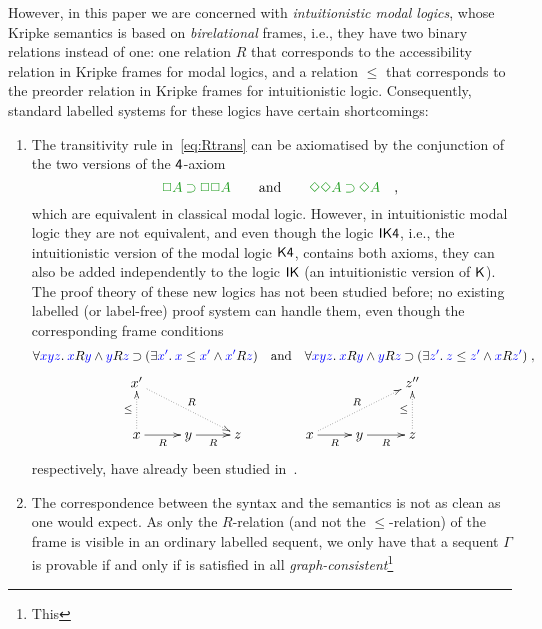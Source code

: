 However,
in this paper we are concerned with \emph{intuitionistic modal
	logics}, whose Kripke semantics is based on \emph{birelational}
frames, i.e., they have two binary relations instead of one: one
relation $R$ that corresponds to the accessibility relation in 
Kripke frames for modal logics, and a relation $\le$ that
corresponds to the preorder relation in Kripke frames for
intuitionistic logic. Consequently, standard labelled systems for
these logics have certain shortcomings:
\begin{enumerate}
	\item The transitivity rule in~\eqref{eq:Rtrans} can be axiomatised by the conjunction of the two
	versions of the $\mathsf{4}$-axiom
	\begin{equation}
	\label{eq:4ax}
	\fm{\BOX A\IMP \BOX\BOX A}
	\qquand
	\fm{\DIA\DIA A\IMP\DIA A}
	\quadcm
	\end{equation}
	which are equivalent in classical
	modal logic. However, in intuitionistic modal logic they are not
	equivalent, and even though the logic $\mathsf{IK4}$, i.e., the
	intuitionistic version of the modal logic $\mathsf{K4}$, contains both
	axioms, they can also be added independently to the logic $\mathsf{IK}$ (an
	intuitionistic version of $\mathsf{K}$). The proof theory of these
	new logics has not been studied before; no existing labelled (or
	label-free) proof system can handle them, even though the
	corresponding frame conditions
	\begin{equation}
	\label{eq:4frame}
	\forall{\color{blue}{xyz}}.\:{\color{blue}{x}}R{\color{blue}{y}}\mathbin{\wedge} {\color{blue}{y}}R{\color{blue}{z}}\mathbin{\supset}(\exists{\color{blue}{x'}}.\:{\color{blue}{x}}\le{{\color{blue}{x'}}}\mathbin{\wedge}{\color{blue}{x'}}R{\color{blue}{z}})
	\quad\mbox{and}\quad
	\forall{\color{blue}{xyz}}.\:{\color{blue}{x}}R{\color{blue}{y}}\mathbin{\wedge} {\color{blue}{y}}R{\color{blue}{z}}\mathbin{\supset}(\exists{\color{blue}{z'}}.\:{\color{blue}{z}}\le{{\color{blue}{z'}}}\mathbin{\wedge}{\color{blue}{x}}R{\color{blue}{z'}})
	\;,
	\end{equation}
	$$
	\xymatrix{
		x' \ar@{.>}[drr]^R \\
		x \ar@{.>}[u]^\le \ar@{->}[r]_{R} & y \ar@{->}[r]_{R} & z
	}
	\qquad\qquad
	\xymatrix{
		&& z''  \\
		x  \ar@{.>}[urr]^R \ar@{->}[r]_{R} & y \ar@{->}[r]_{R} & z \ar@{.>}[u]^\le
	}
	$$
	respectively, have already been studied
	in~\cite{plotkin:stirling:86}.
	\item The correspondence between the syntax and the semantics is not
	as clean as one would expect. As only the $R$-relation (and not the
	$\le$-relation) of the frame is visible in an ordinary labelled
	sequent, we only have that a sequent $\Gamma$ is provable if and
	only if is satisfied in all \emph{graph-consistent}\footnote{This
}
\end{enumerate}
